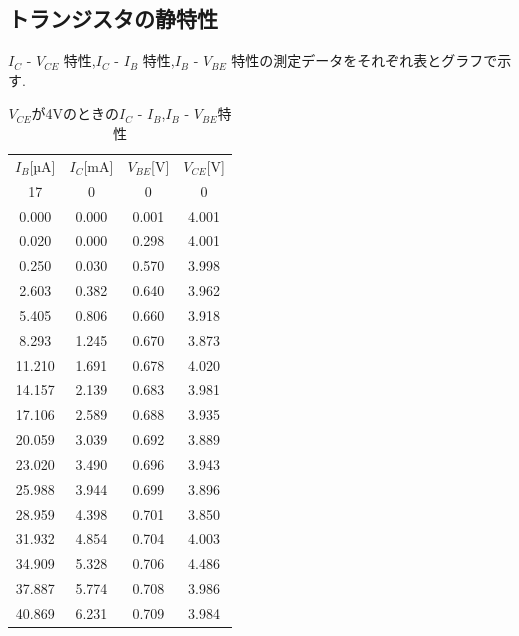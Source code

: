 \documentclass[a4j,10pt,dvipdfmx]{jarticle}
\begin{document}
\subsection{トランジスタの静特性}
$I_C$ - $V_{CE}$ 特性,$I_C$ - $I_B$ 特性,$I_B$ - $V_{BE}$ 特性の測定データをそれぞれ表とグラフで示す.
\begin{table}[H]
  \label{1}
  \begin{center}
  \caption{$V_{CE}$が4Vのときの$I_C$ - $I_B$,$I_B$ - $V_{BE}$特性}
  \begin{tabular}{cccc} \\
  \hline
  $I_B$[µA] & $I_C$[mA] & $V_{BE}$[V] & $V_{CE}$[V] \\
  17 & 0 & 0 & 0 \\
  0.000  & 0.000  & 0.001  & 4.001  \\
  0.020  & 0.000  & 0.298  & 4.001  \\
  0.250  & 0.030  & 0.570  & 3.998  \\
  2.603  & 0.382  & 0.640  & 3.962  \\
  5.405  & 0.806  & 0.660  & 3.918  \\
  8.293  & 1.245  & 0.670  & 3.873  \\
  11.210  & 1.691  & 0.678  & 4.020  \\
  14.157  & 2.139  & 0.683  & 3.981  \\
  17.106  & 2.589  & 0.688  & 3.935  \\
  20.059  & 3.039  & 0.692  & 3.889  \\
  23.020  & 3.490  & 0.696  & 3.943  \\
  25.988  & 3.944  & 0.699  & 3.896  \\
  28.959  & 4.398  & 0.701  & 3.850  \\
  31.932  & 4.854  & 0.704  & 4.003  \\
  34.909  & 5.328  & 0.706  & 4.486  \\
  37.887  & 5.774  & 0.708  & 3.986  \\
  40.869 & 6.231 & 0.709 & 3.984 \\
   \hline
  \end{tabular}
  \end{center}
  \end{table}
\end{document}
